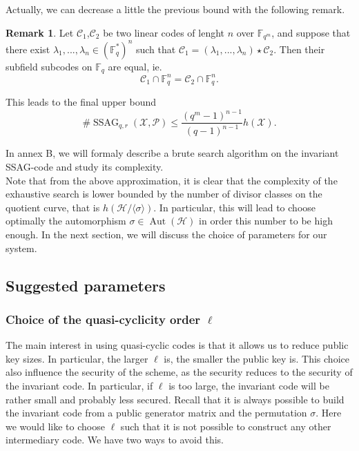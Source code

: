 \documentclass[10pt]{article}
\theoremstyle{definition}
\theoremstyle{definition}
\newtheorem{rq1}[thm]{Remark}
\theoremstyle{definition}
\newcommand{\s}{\vspace{0.3cm}}
\newcommand{\C}{\mathcal{C}}
\newcommand{\fqm}{\mathbb{F}_{q^m}}
\newcommand{\fq}{\mathbb{F}_q}
\newcommand{\X}{\mathcal{X}}
\newcommand{\PR}{\mathcal{P}}
\newcommand{\Aut}{\operatorname{Aut}}
\newcommand{\ssag}{\operatorname{SSAG}}
\begin{document}
Actually, we can decrease a little the previous bound with the following remark.

\s

\begin{rq1}
Let $\C_1$,$\C_2$ be two linear codes of lenght $n$ over $\fqm$, and suppose that there exist $\lambda_1,...,\lambda_n \in (\fq^*)^n$ such that $\C_1 = (\lambda_1,...,\lambda_n) \star \C_2$. Then their subfield subcodes on $\fq$ are equal, ie.
\[\C_1 \cap \fq^n = \C_2 \cap \fq^n.\]
\end{rq1}

\s

This leads to the final upper bound 
\begin{equation} \label{nb of sssag}
 \#\ssag_{q,r}(\X,\PR) \leq \dfrac{(q^m-1)^{n-1}}{(q-1)^{n-1}}h(\X).
\end{equation} 

\s

In annex B, we will formaly describe a brute search algorithm on the invariant SSAG-code and study its complexity. \\
Note that from the above approximation, it is clear that the complexity of the exhaustive search is lower bounded by the number of divisor classes on the quotient curve, that is $h(\mathcal{H}/\langle \sigma \rangle)$. In particular, this will lead to choose optimally the automorphism $\sigma \in \Aut(\mathcal{H})$ in order this number to be high enough. In the next section, we will discuss the choice of parameters for our system.

\s

\subsection{Suggested parameters}

\s

\subsubsection{Choice of the quasi-cyclicity order $\ell$}

\s

The main interest in using quasi-cyclic codes is that it allows us to reduce public key sizes. In particular, the larger $\ell$ is, the smaller the public key is. This choice also influence the security of the scheme, as the security reduces to the security of the invariant code. In particular, if $\ell$ is too large, the invariant code will be rather small and probably less secured. Recall that it is always possible to build the invariant code from a public generator matrix and the permutation $\sigma$. Here we would like to choose $\ell$ such that it is not possible to construct any other intermediary code. We have two ways to avoid this.
\end{document}
